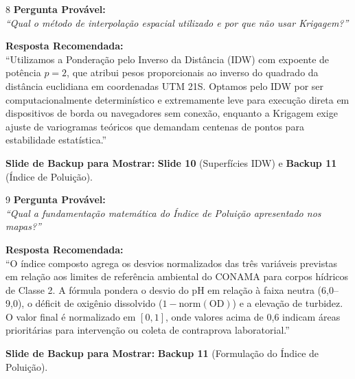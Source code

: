 \documentclass[11pt,a4paper]{article}
\begin{document}
\begin{qnabox}{8}
\textbf{Pergunta Provável:}\\
\textit{``Qual o método de interpolação espacial utilizado e por que não usar Krigagem?''}

\vspace{0.2cm}
\textbf{Resposta Recomendada:}\\
``Utilizamos a Ponderação pelo Inverso da Distância (IDW) com expoente de potência $p=2$, que atribui pesos proporcionais ao inverso do quadrado da distância euclidiana em coordenadas UTM 21S. Optamos pelo IDW por ser computacionalmente determinístico e extremamente leve para execução direta em dispositivos de borda ou navegadores sem conexão, enquanto a Krigagem exige ajuste de variogramas teóricos que demandam centenas de pontos para estabilidade estatística.''

\vspace{0.2cm}
\textbf{Slide de Backup para Mostrar:} \textbf{Slide 10} (Superfícies IDW) e \textbf{Backup 11} (Índice de Poluição).
\end{qnabox}

\begin{qnabox}{9}
\textbf{Pergunta Provável:}\\
\textit{``Qual a fundamentação matemática do Índice de Poluição apresentado nos mapas?''}

\vspace{0.2cm}
\textbf{Resposta Recomendada:}\\
``O índice composto agrega os desvios normalizados das três variáveis previstas em relação aos limites de referência ambiental do CONAMA para corpos hídricos de Classe 2. A fórmula pondera o desvio do pH em relação à faixa neutra (6,0--9,0), o déficit de oxigênio dissolvido ($1 - \text{norm}(\text{OD})$) e a elevação de turbidez. O valor final é normalizado em $[0, 1]$, onde valores acima de 0,6 indicam áreas prioritárias para intervenção ou coleta de contraprova laboratorial.''

\vspace{0.2cm}
\textbf{Slide de Backup para Mostrar:} \textbf{Backup 11} (Formulação do Índice de Poluição).
\end{qnabox}
\end{document}
